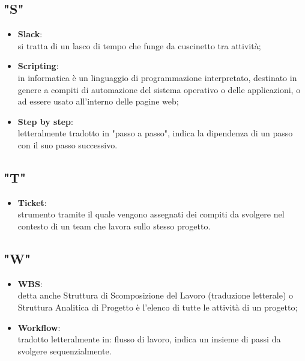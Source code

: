 \subsection{"S"}
\begin{itemize}
\item \textbf{Slack}:\\ si tratta di un lasco di tempo che funge da cuscinetto tra attività;
\item \textbf{Scripting}:\\ in informatica è un linguaggio di programmazione interpretato, destinato in genere a compiti di automazione del sistema operativo o delle applicazioni, o ad essere usato all'interno delle pagine web;
\item \textbf{Step by step}:\\ letteralmente tradotto in "passo a passo", indica la dipendenza di un passo con il suo passo successivo.
\end{itemize} 

\subsection{"T"}
\begin{itemize}
\item \textbf{Ticket}:\\ strumento tramite il quale vengono assegnati dei compiti da svolgere nel contesto di un team che lavora sullo stesso progetto.
\end{itemize}

\subsection{"W"}
\begin{itemize}
\item \textbf{WBS}:\\ detta anche Struttura di Scomposizione del Lavoro (traduzione letterale) o Struttura Analitica di Progetto è l'elenco di tutte le attività di un progetto;
\item \textbf{Workflow}:\\ tradotto letteralmente in: flusso di lavoro, indica un insieme di passi da svolgere sequenzialmente.
\end{itemize}

